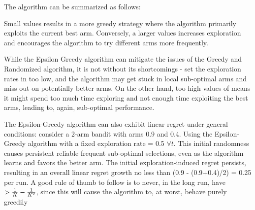 The algorithm can be summarized as follows:


Small \epsilonFunction values results in a more greedy strategy where the algorithm primarily exploits the current best arm. Conversely, a larger  \epsilonFunction values increases exploration and encourages the algorithm to try different arms more frequently.

While the Epsilon Greedy algorithm can mitigate the issues of the Greedy and Randomized algorithm, it is not without its shortcomings - set the exploration rates in \epsilonFunction too low, and the algorithm may get stuck in local sub-optimal arms and miss out on potentially better arms. On the other hand, too high values of \epsilonFunction means it might spend too much time exploring and not enough time exploiting the best arms, leading to, again, sub-optimal performance.

The Epsilon-Greedy algorithm can also exhibit linear regret under general conditions: consider a 2-arm bandit with arms 0.9 and 0.4. Using the Epsilon-Greedy algorithm with a fixed exploration rate \epsilonFunction = 0.5 $\forall t$. This initial randomness causes persistent reliable frequent sub-optimal selections, even as the algorithm learns and favors the better arm. The initial exploration-induced regret persists, resulting in an overall linear regret growth no less than (0.9 - (0.9+0.4)/2) = 0.25 per run. A good rule of thumb to follow is to never, in the long run, have \epsilonFunction $> \frac{1}{K} - \frac{1}{K^2}$, since this will cause the algorithm to, at worst, behave purely greedily


